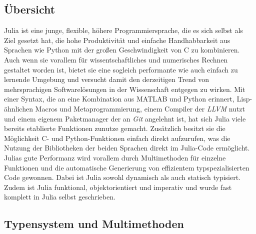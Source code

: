 \documentclass[proseminar,german,utf8]{zihpub}
\begin{document}
\subsection{Übersicht}

Julia ist eine junge, flexible, höhere Programmiersprache, die es sich selbst als Ziel gesetzt hat, die hohe Produktivität und einfache Handhabbarkeit aus Sprachen wie Python mit der großen Geschwindigkeit von C zu kombinieren. Auch wenn sie vorallem für wissentschaftliches und numerisches Rechnen gestaltet worden ist, bietet sie eine sogleich performante wie auch einfach zu lernende Umgebung und versucht damit den derzeitigen Trend von mehrsprachigen Softwarelösungen in der Wissenschaft entgegen zu wirken. Mit einer Syntax, die an eine Kombination aus MATLAB und Python erinnert, Lisp-ähnlichen Macros und Metaprogrammierung, einem Compiler der \textit{LLVM} nutzt und einem eigenem Paketmanager der an \textit{Git} angelehnt ist, hat sich Julia viele bereits etablierte Funktionen zunutze gemacht. Zusätzlich besitzt sie die Möglichkeit C- und Python-Funktionen einfach direkt aufzurufen, was die Nutzung der Bibliotheken der beiden Sprachen direkt im Julia-Code ermöglicht. Julias gute Performanz wird vorallem durch Multimethoden für einzelne Funktionen und die automatische Generierung von effizientem typspezialisierten Code gewonnen. Dabei ist Julia sowohl dynamisch als auch statisch typisiert. Zudem ist Julia funktional, objektorientiert und imperativ und wurde fast komplett in Julia selbst geschrieben. ~\cite{NominalTypSystemWiki}~\cite{TypSystemWiki}~\cite{JuliaLangIntro}~\cite{JuliaBasicHeise}

\subsection{Typensystem und Multimethoden}
\end{document}
